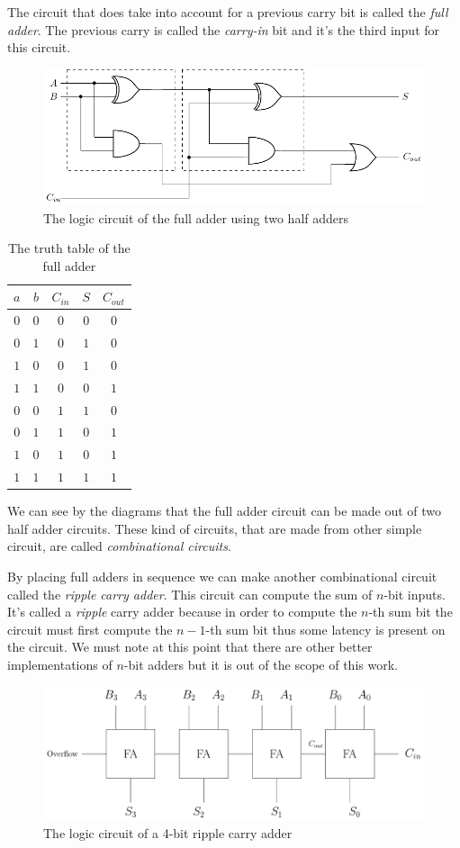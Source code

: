 The circuit that does take into account for a previous carry bit is called the \textit{full adder}.
The previous carry is called the \textit{carry-in} bit and it's the third input for this circuit.

\begin{figure}[ht]
    \centering
    \includegraphics{images/5_Implementation/classical_fulladder_diagram.pdf}
    \caption{The logic circuit of the full adder using two half adders}
\end{figure}

\begin{table}[ht]
    \centering
    \begin{tabular}{ccc|cc}
        $a$ & $b$ & $C_{in}$ & $S$ & $C_{out}$ \\
        \hline
        $0$ & $0$ & $0$ & $0$ & $0$ \\
        $0$ & $1$ & $0$ & $1$ & $0$ \\
        $1$ & $0$ & $0$ & $1$ & $0$ \\
        $1$ & $1$ & $0$ & $0$ & $1$ \\
        $0$ & $0$ & $1$ & $1$ & $0$ \\
        $0$ & $1$ & $1$ & $0$ & $1$ \\
        $1$ & $0$ & $1$ & $0$ & $1$ \\
        $1$ & $1$ & $1$ & $1$ & $1$ \\
    \end{tabular}
    \caption{The truth table of the full adder}
\end{table}

We can see by the diagrams that the full adder circuit can be made out of
two half adder circuits. These kind of circuits, that are made from other
simple circuit, are called \textit{combinational circuits}.

By placing full adders in sequence we can make another combinational circuit
called the \textit{ripple carry adder}. This circuit can compute the sum
of $n$-bit inputs. It's called a \textit{ripple} carry adder because in order
to compute the $n$-th sum bit the circuit must first compute the $n-1$-th
sum bit thus some latency is present on the circuit. We must note at this point
that there are other better implementations of $n$-bit adders but it is out of
the scope of this work.

\begin{figure}[ht]
    \centering
    \includegraphics[width=14cm]{images/2_Classical_Computing/ripple_carry_adder.pdf}
    \caption{The logic circuit of a 4-bit ripple carry adder}
\end{figure}